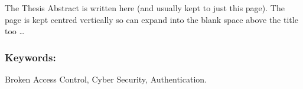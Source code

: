 The Thesis Abstract is written here (and usually kept to just this page). The page is kept centred vertically so can expand into the blank space above the title too \ldots

\subsubsection*{Keywords:} Broken Access Control, Cyber Security, Authentication.
